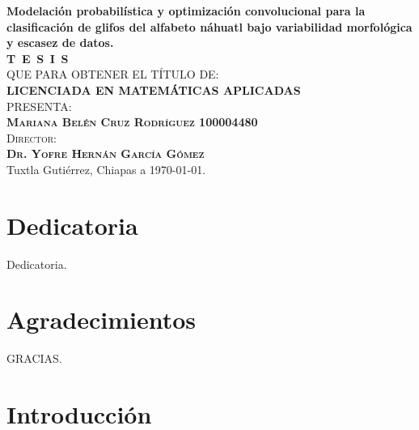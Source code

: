 \documentclass[
  spanish,
  us-letterpaper,
]{scrreprt}
\renewcommand*\contentsname{Tabla de contenidos}
\newcommand\contentsname{Tabla de contenidos}
\theoremstyle{definition}
\theoremstyle{remark}
\begin{document}
\begin{titlepage}
\begin{minipage}[t][0.95\textheight][c]{0.76\textwidth}
            \begin{center}
                \vspace{0.7cm}
                {\Large\bfseries Modelación probabilística y optimización convolucional para la clasificación de glifos del alfabeto náhuatl bajo variabilidad morfológica y escasez de datos.}\\[2cm]
                \textsc{\huge \textbf{T\, E\, S\, I\, S}}\\[1.5cm]
                \textsc{\large QUE PARA OBTENER EL TÍTULO DE:}\\[0.3cm]
                \textbf{\textsc{LICENCIADA EN MATEMÁTICAS APLICADAS}}\\[1.5cm]
                \textsc{\large PRESENTA:}\\[0.3cm]
                \textbf{\textsc{\large {Mariana Belén Cruz Rodríguez 100004480}}}\\[2cm]
                {\large\scshape Director:\\[0.3cm]
                {\textbf{\large Dr. Yofre Hernán García Gómez }}}\\[2.0cm]
                \large{Tuxtla Gutiérrez, Chiapas a \today.}

            \end{center}
\end{minipage}
\end{titlepage}

\pagebreak[2]

\chapter*{Dedicatoria}
\begin{flushright}
\itshape
\setlength{\parindent}{0pt} %
\setlength{\parskip}{1.2\baselineskip} %

Dedicatoria.
\end{flushright}


\chapter*{Agradecimientos}

GRACIAS.
\renewcommand*\contentsname{Tabla de contenidos}
{
\hypersetup{linkcolor=}
\setcounter{tocdepth}{2}
\tableofcontents
}


\chapter{Introducción}\label{introducciuxf3n}
\end{document}
